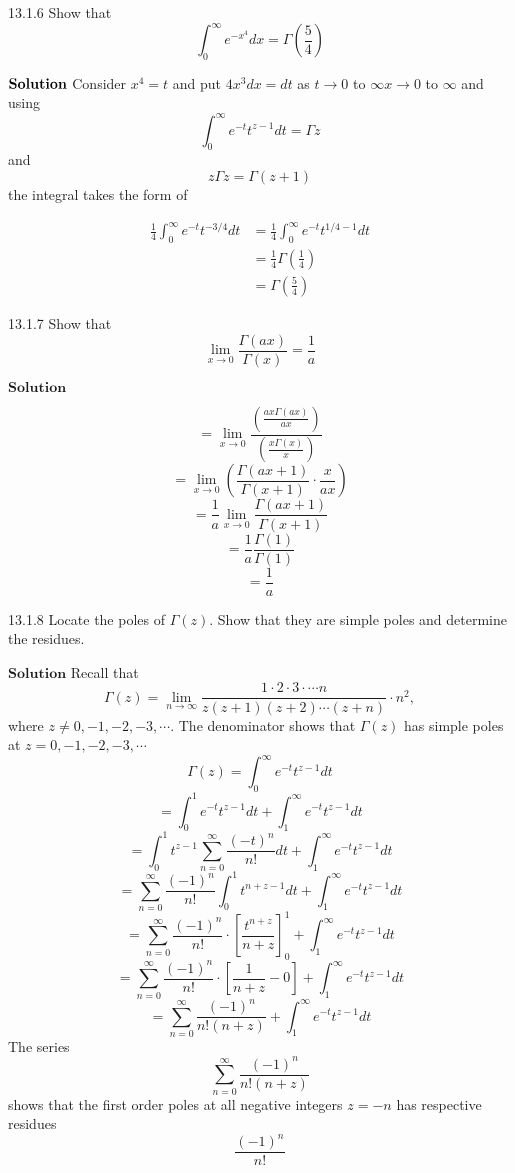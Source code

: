 \documentclass{article}
\begin{document}
\begin{flushleft}
\newpage

\begin{mybox}{13.1.6}
Show that
$$
\int_{0}^{\infty} e^{-x^{4}} d x=\Gamma\left(\frac{5}{4}\right)
$$
\end{mybox}

$\textbf{\textbf{Solution}}$ Consider $x^{4}=t$ and put $4x^3 dx = dt$ as $t \rightarrow 0$ to $\infty x \rightarrow 0$ to $\infty$ and using
$$
\int_{0}^{\infty} e^{-t} t^{z-1} d t=\Gamma z
$$
and
$$
z \Gamma z=\Gamma(z+1)
$$
the integral takes the form of

$$\begin{aligned} \frac{1}{4} \int_{0}^{\infty} e^{-t} t^{-3 / 4} d t &=\frac{1}{4} \int_{0}^{\infty} e^{-t} t^{1 / 4-1} d t \\ &=\frac{1}{4} \Gamma\left(\frac{1}{4}\right) \\ &=\Gamma\left(\frac{5}{4}\right) \end{aligned}$$

\newpage


\begin{mybox}{13.1.7}
Show that
$$
\lim _{x \rightarrow 0} \frac{\Gamma(a x)}{\Gamma(x)}=\frac{1}{a}
$$
\end{mybox}

$\boxed{\textbf{Solution}}$ 

$$=\lim _{x \rightarrow 0} \frac{\left(\frac{a x \Gamma(a x)}{a x}\right)}{\left(\frac{x \Gamma(x)}{x}\right)}$$
$$=\lim _{x \rightarrow 0}\left(\frac{\Gamma(a x+1)}{\Gamma(x+1)} \cdot \frac{x}{a x}\right)$$
$$=\frac{1}{a} \lim _{x \rightarrow 0} \frac{\Gamma(a x+1)}{\Gamma(x+1)}$$
$$=\frac{1}{a} \frac{\Gamma(1)}{\Gamma(1)}$$
$$=\frac{1}{a}$$

\newpage


\begin{mybox}{13.1.8}
Locate the poles of $\Gamma(z)$. Show that they are simple poles and determine the residues.
\end{mybox}
$\boxed{\textbf{Solution}}$
Recall that 
$$\Gamma(z)=\lim _{n \rightarrow \infty} \frac{1 \cdot 2 \cdot 3 \cdot \cdots n}{z(z+1)(z+2) \cdots(z+n)} \cdot n^{2},$$ where $z \neq 0,-1,-2,-3, \cdots$. The denominator shows that $\Gamma(z)$ has simple poles at $z=0,-1,-2,-3, \cdots$
$$\Gamma(z)=\int_{0}^{\infty} e^{-t} t^{z-1} d t$$
$$=\int_{0}^{1} e^{-t} t^{z-1} d t+\int_{1}^{\infty} e^{-t} t^{z-1} d t$$
$$=\int_{0}^{1} t^{z-1} \sum_{n=0}^{\infty} \frac{(-t)^{n}}{n !} d t+\int_{1}^{\infty} e^{-t} t^{z-1} d t$$
$$=\sum_{n=0}^{\infty} \frac{(-1)^{n}}{n !} \int_{0}^{1} t^{n+z-1} d t+\int_{1}^{\infty} e^{-t} t^{z-1} d t$$
$$=\sum_{n=0}^{\infty} \frac{(-1)^{n}}{n !} \cdot\left[\frac{t^{n+z}}{n+z}\right]_{0}^{1}+\int_{1}^{\infty} e^{-t} t^{z-1} d t$$
$$=\sum_{n=0}^{\infty} \frac{(-1)^{n}}{n !} \cdot\left[\frac{1}{n+z}-0\right]+\int_{1}^{\infty} e^{-t} t^{z-1} d t$$
$$=\sum_{n=0}^{\infty} \frac{(-1)^{n}}{n !(n+z)}+\int_{1}^{\infty} e^{-t} t^{z-1} d t$$
The series 
$$\sum_{n=0}^{\infty} \frac{(-1)^{n}}{n !(n+z)}$$ 
shows that the first order poles at all negative integers $z=-n$ has respective residues 
$$\frac{(-1)^{n}}{n !}$$


\end{flushleft}
\end{document}
